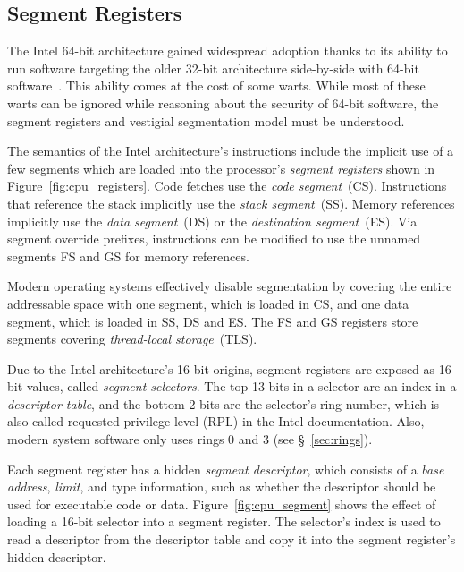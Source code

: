 \subsection{Segment Registers}
\label{sec:segments}

The Intel 64-bit architecture gained widespread adoption thanks to its ability
to run software targeting the older 32-bit architecture side-by-side
with 64-bit software~\cite{cnet2005itanium}. This ability comes at the cost of
some warts. While most of these warts can be ignored while reasoning about the
security of 64-bit software, the segment registers and vestigial
segmentation model must be understood.

The semantics of the Intel architecture's instructions include the implicit use
of a few segments which are loaded into the processor's \textit{segment
registers} shown in Figure~\ref{fig:cpu_registers}. Code fetches use the
\textit{code segment}~(CS). Instructions that reference the stack implicitly
use the \textit{stack segment}~(SS). Memory references implicitly use the
\textit{data segment}~(DS) or the \textit{destination segment}~(ES). Via
segment override prefixes, instructions can be modified to use the unnamed
segments FS and GS for memory references.

Modern operating systems effectively disable segmentation by covering the
entire addressable space with one segment, which is loaded in CS, and one data
segment, which is loaded in SS, DS and ES. The FS and GS registers store
segments covering \textit{thread-local storage}~(TLS).


Due to the Intel architecture's 16-bit origins, segment registers are exposed
as 16-bit values, called \textit{segment selectors}. The top 13 bits in a
selector are an index in a \textit{descriptor table}, and the bottom 2 bits are
the selector's ring number, which is also called requested privilege level
(RPL) in the Intel documentation. Also, modern system software only uses rings
0 and 3 (see \S~\ref{sec:rings}).


Each segment register has a hidden \textit{segment descriptor}, which consists
of a \textit{base address}, \textit{limit}, and type information, such as
whether the descriptor should be used for executable code or data.
Figure~\ref{fig:cpu_segment} shows the effect of loading a 16-bit selector into
a segment register. The selector's index is used to read a descriptor from the
descriptor table and copy it into the segment register's hidden descriptor.

